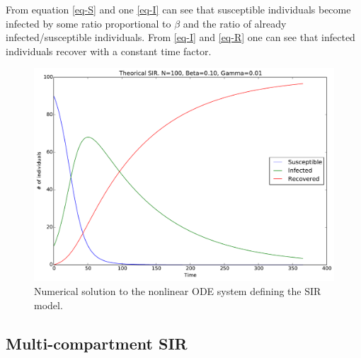 From equation \eqref{eq-S} and one \eqref{eq-I} can see that susceptible individuals become infected by some ratio proportional to $\beta$ and the ratio of already infected/susceptible individuals. From \eqref{eq-I} and \eqref{eq-R} one can see that infected individuals recover with a constant time factor. 

\begin{figure}[H]
	\centering
	\includegraphics[width= 1.0 \linewidth]{plots/sir_one_region.pdf}
	\caption{Numerical solution to the nonlinear ODE system defining the SIR model.}
\end{figure}




\subsection{Multi-compartment SIR}